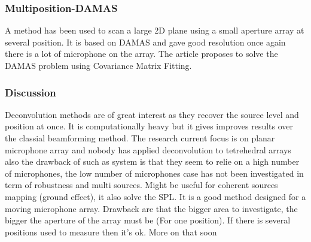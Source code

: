 \subsubsection{Multiposition-DAMAS}

A method has been used to scan a large 2D plane using a small aperture array at several position. It is based on DAMAS and gave good resolution once again there is a lot of microphone on the array. The article proposes to solve the DAMAS problem using Covariance Matrix Fitting.






\subsubsection{Discussion}

Deconvolution methods are of great interest as they recover the source level and position at once. It is computationally heavy but it gives improves results over the classial beamforming method. The research current focus is on planar microphone array and nobody has applied deconvolution to tetrehedral arrays also the drawback of such as system is that they seem to relie on a high number of microphones, the low number of microphones case has not been investigated in term of robustness and multi sources.
Might be useful for coherent sources mapping (ground effect), it also solve the SPL. It is a good method designed for a moving microphone array. Drawback are that the bigger area to investigate, the bigger the aperture of the array must be (For one position). If there is several positions used to measure then it's ok.  More on that soon
